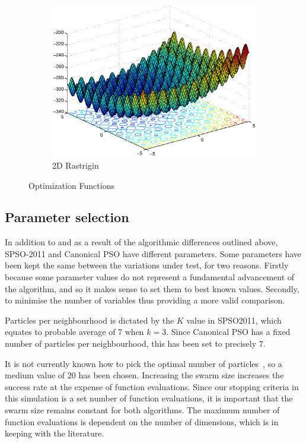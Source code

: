 \documentclass{csfourzero}
\begin{document}
\begin{figure}
\begin{subfigure}[b]{0.3\textwidth}
    \includegraphics[width=\textwidth]{../functions/rastrigin_shifted.eps}
    \caption{2D Rastrigin}
    \label{fig:rastrigin}
  \end{subfigure}
  \caption{Optimization Functions}
  \label{fig:functions}
\end{figure}

\subsection{Parameter selection}

In addition to and as a result of the algorithmic differences outlined above,
SPSO-2011 and Canonical PSO have different parameters. Some parameters have
been kept the same between the variations under test, for two reasons. Firstly
because some parameter values do not represent a fundamental advancement of the
algorithm, and so it makes sense to set them to best known values.  Secondly,
to minimise the number of variables thus providing a more valid comparison.

Particles per neighbourhood is dictated by the $K$ value in SPSO2011, which
equates to probable average of 7 when $k = 3$. Since Canonical PSO has a fixed
number of particles per neighbourhood, this has been set to precisely 7.

It is not currently known how to pick the optimal number of
particles~\cite{Trelea:2003dv}, so a medium value of 20 has been chosen.
Increasing the swarm size increases the success rate at the expense of function
evaluations. Since our stopping criteria in this simulation is a set number of
function evaluations, it is important that the swarm size remains constant for
both algorithms. The maximum number of function evaluations is dependent on the
number of dimensions, which is in keeping with the literature.
\end{document}
